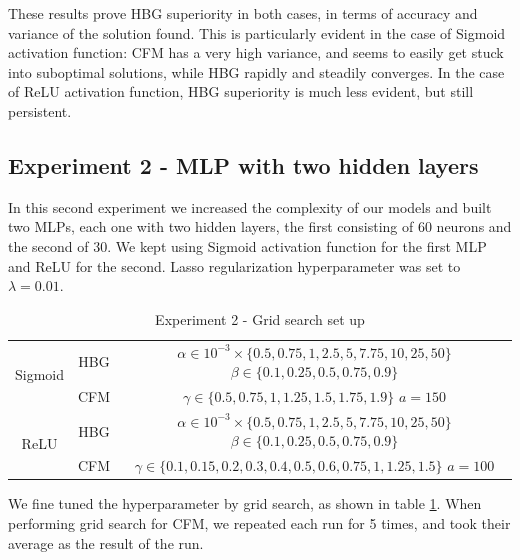 These results prove HBG superiority in both cases, in terms of accuracy and variance of the solution found. This is particularly evident in the case of Sigmoid activation function: CFM has a very high variance, and seems to easily get stuck into suboptimal solutions, while HBG rapidly and steadily converges. In the case of ReLU activation function, HBG superiority is much less evident, but still persistent.


\subsection{Experiment 2 - MLP with two hidden layers}
\label{exp2}
In this second experiment we increased the complexity of our models and built two MLPs, each one with two hidden layers, the first consisting of 60 neurons and the second of 30. We kept using Sigmoid activation function for the first MLP and ReLU for the second. Lasso regularization hyperparameter was set to $\lambda = 0.01$.

\begin{table}[htbp]
    \centering
    \begin{tabular}{|c|c|c|}
        \hline
        \multirow{2}{3.5em}{Sigmoid} & HBG & \makecell{$\alpha \in 10^{-3} \times \{0.5, 0.75, 1, 2.5, 5, 7.75, 10, 25, 50\}$ \\ $\beta \in \{0.1, 0.25, 0.5, 0.75, 0.9\}$} \\
        \cline{2-3}
         & CFM & \makecell{$\gamma \in \{0.5, 0.75, 1, 1.25, 1.5, 1.75, 1.9\}$ \\ $a = 150$} \\
        \hline
        \multirow{2}{3.5em}{ReLU} & HBG & \makecell{$\alpha \in 10^{-3} \times \{0.5, 0.75, 1, 2.5, 5, 7.75, 10, 25, 50\}$ \\ $\beta \in \{0.1, 0.25, 0.5, 0.75, 0.9\}$} \\
        \cline{2-3}
         & CFM & \makecell{$\gamma \in \{0.1, 0.15, 0.2, 0.3, 0.4, 0.5, 0.6, 0.75, 1, 1.25, 1.5\}$ \\ $a = 100$} \\
        \hline
    \end{tabular}
    \caption{Experiment 2 - Grid search set up}
    \label{tab:2_gs}
\end{table}

We fine tuned the hyperparameter by grid search, as shown in table \ref{tab:2_gs}. When performing grid search for CFM, we repeated each run for 5 times, and took their average as the result of the run.

